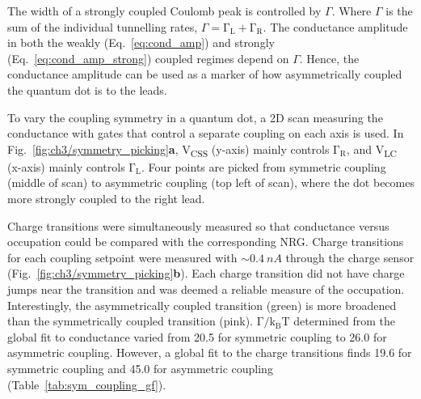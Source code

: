 The width of a strongly coupled Coulomb peak is controlled by $\Gamma$. Where $\Gamma$ is the sum of the individual tunnelling rates, $\Gamma=\mathrm{\Gamma_L} + \mathrm{\Gamma_R}$. 
The conductance amplitude in both the weakly (Eq.~\ref{eq:cond_amp}) and strongly (Eq.~\ref{eq:cond_amp_strong}) coupled regimes depend on $\Gamma$. Hence, the conductance amplitude can be used as a marker of how asymmetrically coupled the quantum dot is to the leads. 


To vary the coupling symmetry in a quantum dot, a 2D scan measuring the conductance with gates that control a separate coupling on each axis is used. In Fig.~\ref{fig:ch3/symmetry_picking}\textbf{a}, V\textsubscript{CSS} (y-axis) mainly controls $\mathrm{\Gamma_R}$, and V\textsubscript{LC} (x-axis) mainly controls $\mathrm{\Gamma_L}$. Four points are picked from symmetric coupling (middle of scan) to asymmetric coupling (top left of scan), where the dot becomes more strongly coupled to the right lead. 




Charge transitions were simultaneously measured so that conductance versus occupation could be compared with the corresponding NRG. 
Charge transitions for each coupling setpoint were measured with $\sim\qty{0.4}{nA}$ through the charge sensor (Fig.~\ref{fig:ch3/symmetry_picking}\textbf{b}). 
Each charge transition did not have charge jumps near the transition and was deemed a reliable measure of the occupation. Interestingly, the asymmetrically coupled transition (green) is more broadened than the symmetrically coupled transition (pink). $\mathrm{\Gamma/k_BT}$ determined from the global fit to conductance varied from 20.5 for symmetric coupling to 26.0 for asymmetric coupling. However, a global fit to the charge transitions finds 19.6 for symmetric coupling and 45.0 for asymmetric coupling (Table~\ref{tab:sym_coupling_gf}). 

